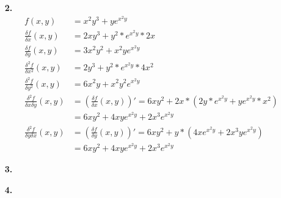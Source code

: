 \documentclass[a4paper,11pt,fleqn]{scrartcl}
\begin{document}
\begin{enumerate}
\item[\textbf{2.}]
	\begin{align*}
		f(x,y)&=x^2y^3+ye^{x^2y}\\
		\frac{\delta f}{\delta x}(x,y)&=2xy^3+y^2*e^{x^2y}*2x\\
		\frac{\delta f}{\delta y}(x,y)&=3x^2y^2+x^2ye^{x^2y}\\
		\frac{\delta^2 f}{\delta x^2}(x,y)&=2y^3+y^2*e^{x^2y}*4x^2\\
		\frac{\delta^2 f}{\delta y^2}(x,y)&=6x^2y+x^2y^2e^{x^2y}\\
		\frac{\delta^2 f}{\delta x \delta y}(x,y)&=\left( \frac{\delta f}{\delta x}(x,y) \right)'=6xy^2+2x*\left( 2y*e^{x^2y} + ye^{x^2y}*x^2 \right)\\
		&=6xy^2+4xye^{x^2y}+2x^3e^{x^2y}\\
		\frac{\delta^2 f}{\delta y \delta x}(x,y)&=\left( \frac{\delta f}{\delta y}(x,y) \right)'=6xy^2+y*\left( 4xe^{x^2y}+2x^3ye^{x^2y} \right)\\
		&=6xy^2+4xye^{x^2y}+2x^3e^{x^2y}
	\end{align*}

\item[\textbf{3.}]
    

\item[\textbf{4.}]

\end{enumerate}
\end{document}
